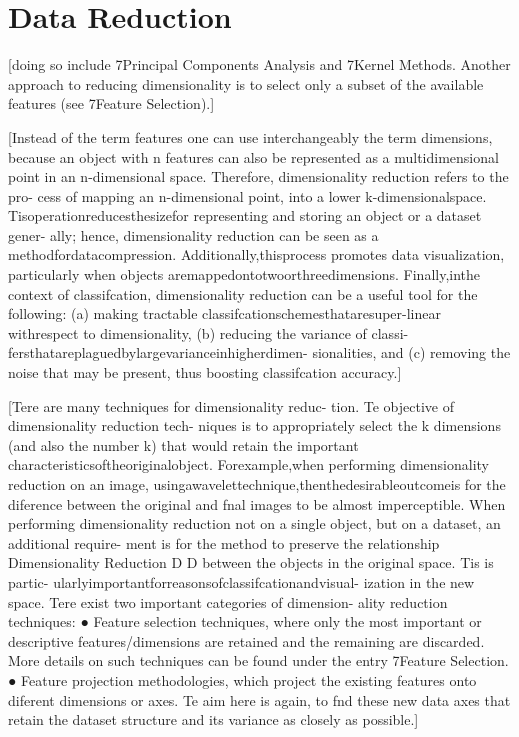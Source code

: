 \section{Data Reduction}

[doing so include 7Principal Components Analysis and
7Kernel Methods.
Another approach to reducing dimensionality is
to select only a subset of the available features (see
7Feature Selection).]



[Instead of the term features one
can use interchangeably the term dimensions, because
an object with n features can also be represented as
a multidimensional point in an n-dimensional space.
Therefore, dimensionality reduction refers to the pro-
cess of mapping an n-dimensional point, into a lower
k-dimensionalspace.
Tisoperationreducesthesizefor
representing and storing an object or a dataset gener-
ally; hence, dimensionality reduction can be seen as a
methodfordatacompression.
Additionally,thisprocess
promotes data visualization, particularly when objects
aremappedontotwoorthreedimensions.
Finally,inthe
context of classifcation, dimensionality reduction can
be a useful tool for the following: (a) making tractable
classifcationschemesthataresuper-linear withrespect
to dimensionality, (b) reducing the variance of classi-
fersthatareplaguedbylargevarianceinhigherdimen-
sionalities, and (c) removing the noise that may be
present, thus boosting classifcation accuracy.]


[Tere are many techniques for dimensionality reduc-
tion. Te objective of dimensionality reduction tech-
niques is to appropriately select the k dimensions (and
also the number k) that would retain the important
characteristicsoftheoriginalobject.
Forexample,when
performing dimensionality reduction on an image,
usingawavelettechnique,thenthedesirableoutcomeis
for the diference between the original and fnal images
to be almost imperceptible.
When performing dimensionality reduction not on
a single object, but on a dataset, an additional require-
ment is for the method to preserve the relationship
Dimensionality Reduction D 
D
between the objects in the original space. Tis is partic-
ularlyimportantforreasonsofclassifcationandvisual-
ization in the new space.
Tere exist two important categories of dimension-
ality reduction techniques:
● Feature selection techniques, where only the most
important or descriptive features/dimensions are
retained and the remaining are discarded. 
More
details on such techniques can be found under the
entry 7Feature Selection.
● Feature projection methodologies, which project the
existing features onto diferent dimensions or axes.
Te aim here is again, to fnd these new data axes
that retain the dataset structure and its variance as
closely as possible.]



